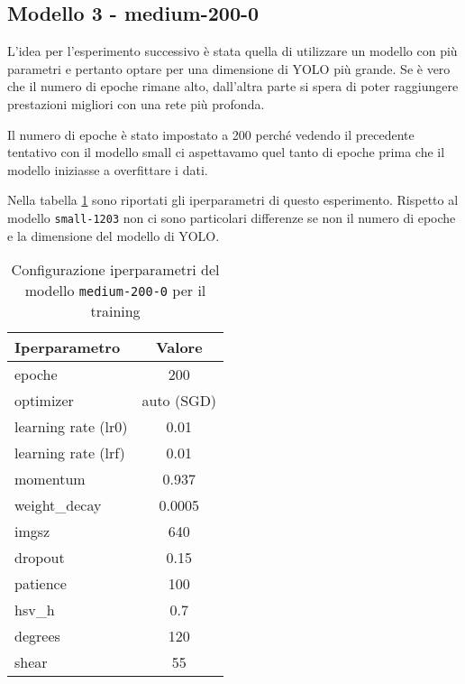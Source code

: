 \subsection*{Modello 3 - medium-200-0}

L'idea per l'esperimento successivo è stata quella di utilizzare un modello con più parametri e
pertanto optare per una dimensione di YOLO più grande. Se è vero che il numero di epoche rimane
alto, dall'altra parte si spera di poter raggiungere prestazioni migliori con una rete più profonda.

Il numero di epoche è stato impostato a 200 perché vedendo il precedente tentativo con il modello small
ci aspettavamo quel tanto di epoche prima che il modello iniziasse a overfittare i dati. 

Nella tabella \ref*{tab:v3-model-configs} sono riportati gli iperparametri di questo esperimento. 
Rispetto al modello \texttt{small-1203} non ci sono particolari differenze se non il numero di epoche e 
la dimensione del modello di YOLO. 

\begin{table}[!htb]
    \centering
    \begin{tabular}{lc}
        \hline
        \textbf{Iperparametro} & \textbf{Valore} \\
        \hline
        epoche & 200  \\
        optimizer & auto (SGD) \\
        learning rate (lr0) & 0.01 \\
        learning rate (lrf) & 0.01 \\
        momentum & 0.937 \\
        weight\_decay & 0.0005 \\
        imgsz & 640 \\
        dropout & 0.15 \\
        patience & 100 \\
        \midrule
        hsv\_h & 0.7 \\
        degrees & 120 \\
        shear & 55 \\
        \hline
    \end{tabular}
    \caption{Configurazione iperparametri del modello \texttt{medium-200-0} per il training}
    \label{tab:v3-model-configs}
    \end{table}

    

